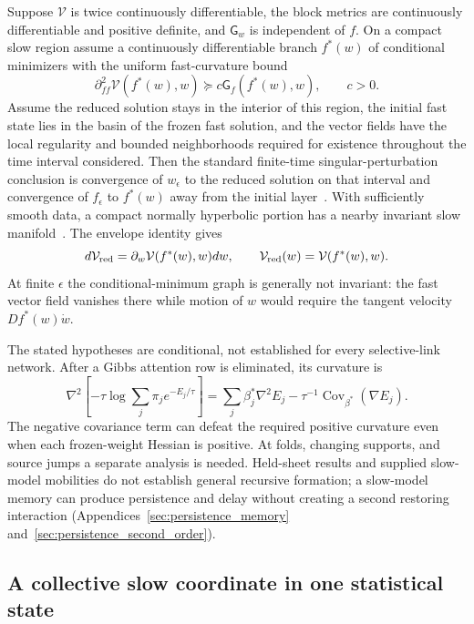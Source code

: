 Suppose $\mathcal V$ is twice continuously differentiable, the block metrics are continuously differentiable and positive definite, and $\mathsf G_w$ is independent of $f$. On a compact slow region assume a continuously differentiable branch $f^*(w)$ of conditional minimizers with the uniform fast-curvature bound
\begin{equation}
\partial_{ff}^2\mathcal V(f^*(w),w)\succeq c\mathsf G_f(f^*(w),w),\qquad c>0.
\end{equation}
Assume the reduced solution stays in the interior of this region, the initial fast state lies in the basin of the frozen fast solution, and the vector fields have the local regularity and bounded neighborhoods required for existence throughout the time interval considered. Then the standard finite-time singular-perturbation conclusion is convergence of $w_\epsilon$ to the reduced solution on that interval and convergence of $f_\epsilon$ to $f^*(w)$ away from the initial layer~\cite{Tikhonov1952}. With sufficiently smooth data, a compact normally hyperbolic portion has a nearby invariant slow manifold~\cite{fenichel1979geometric}. The envelope identity gives
\begin{equation}
d\mathcal V_{\rm red}=\partial_w\mathcal V(f^*(w),w)dw,
\qquad \mathcal V_{\rm red}(w)=\mathcal V(f^*(w),w).
\end{equation}
At finite $\epsilon$ the conditional-minimum graph is generally not invariant: the fast vector field vanishes there while motion of $w$ would require the tangent velocity $Df^*(w)\dot w$.

The stated hypotheses are conditional, not established for every selective-link network. After a Gibbs attention row is eliminated, its curvature is
\begin{equation}
\nabla^2\left[-\tau\log\sum_j\pi_j e^{-E_j/\tau}\right]
=\sum_j\beta_j^*\nabla^2E_j-\tau^{-1}\operatorname{Cov}_{\beta^*}(\nabla E_j).
\end{equation}
The negative covariance term can defeat the required positive curvature even when each frozen-weight Hessian is positive. At folds, changing supports, and source jumps a separate analysis is needed. Held-sheet results and supplied slow-model mobilities do not establish general recursive formation; a slow-model memory can produce persistence and delay without creating a second restoring interaction (Appendices~\ref{sec:persistence_memory} and~\ref{sec:persistence_second_order}).

\subsection{A collective slow coordinate in one statistical state}
\label{sec:slow_collective_memory_graph}

